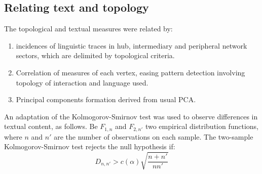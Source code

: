 \documentclass[%
 aip,
 jmp,%
 amsmath,amssymb,
 reprint,%
]{revtex4-1}
\begin{document}
%
\subsection{Relating text and topology}\label{sec:ks}
The topological and textual measures were related by:
\begin{enumerate}
    \item incidences of linguistic traces in hub, intermediary and peripheral network sectors, which are delimited by topological criteria.
    \item Correlation of measures of each vertex, easing pattern detection involving topology of interaction and language used.
    \item Principal components formation derived from usual PCA.
\end{enumerate}

An adaptation of the Kolmogorov-Smirnov test was used to observe differences in textual content, as follows.
Be $F_{1,n}$ and $F_{2,n'}$ two empirical distribution functions, where $n$ and $n'$ are the number of observations on each sample. The two-sample Kolmogorov-Smirnov test rejects the null hypothesis if:
\begin{equation}\label{eq:ks}
D_{n,n'} > c(\alpha)\sqrt{\frac{n+n'}{nn'}}
\end{equation}
\end{document}
